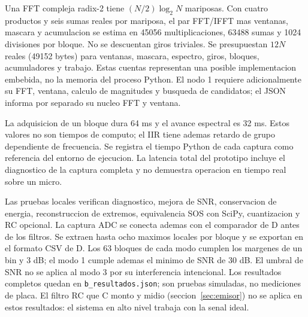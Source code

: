 Una FFT compleja radix-2 tiene $(N/2)\log_2N$ mariposas. Con cuatro productos y
seis sumas reales por mariposa, el par FFT/IFFT mas ventanas, mascara y acumulacion
se estima en 45056 multiplicaciones, 63488 sumas y 1024 divisiones por bloque.
No se descuentan giros triviales. Se presupuestan $12N$ reales (49152 bytes) para
ventanas, mascara, espectro, giros, bloques, acumuladores y trabajo. Estas cuentas
representan una posible implementacion embebida, no la memoria del proceso Python.
El nodo 1 requiere adicionalmente su FFT, ventana, calculo de magnitudes y
busqueda de candidatos; el JSON informa por separado su nucleo FFT y ventana.

La adquisicion de un bloque dura 64 ms y el avance espectral es 32 ms. Estos
valores no son tiempos de computo; el IIR tiene ademas retardo de grupo dependiente
de frecuencia. Se registra el tiempo Python de cada captura como referencia del
entorno de ejecucion. La latencia total del prototipo incluye el diagnostico de
la captura completa y no demuestra operacion en tiempo real sobre un micro.

Las pruebas locales verifican diagnostico, mejora de SNR, conservacion de energia,
reconstruccion de extremos, equivalencia SOS con SciPy, cuantizacion y RC opcional.
La captura ADC se conecta ademas con el comparador de D antes de los filtros.
Se extraen hasta ocho maximos locales por bloque y se exportan en el formato
CSV de D. Los 63 bloques de cada modo cumplen los margenes de un bin y 3 dB;
el modo 1 cumple ademas el minimo de SNR de 30 dB. El umbral de SNR no se aplica
al modo 3 por su interferencia intencional. Los resultados completos quedan en
\texttt{b\_resultados.json}; son pruebas simuladas, no mediciones de placa.
El filtro RC que C monto y midio (seccion~\ref{sec:emisor}) no se aplica en estos
resultados: el sistema en alto nivel trabaja con la senal ideal.
